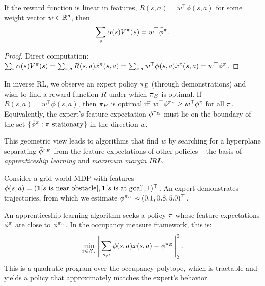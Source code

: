 \documentclass[11pt,a4paper]{article}
\begin{document}
\begin{proposition}
\label{prop:linear-reward}
If the reward function is linear in features,
$R(s,a) = w^\top \phi(s,a)$ for some weight vector $w \in \mathbb{R}^d$,
then
\[
    \sum_s \alpha(s) V^{\pi}(s) = w^\top \bar{\phi}^\pi.
\]
\end{proposition}

\begin{proof}
Direct computation:
$\sum_s \alpha(s) V^{\pi}(s) = \sum_{s,a} R(s,a)
\tilde{x}^\pi(s,a) = \sum_{s,a} w^\top \phi(s,a)
\tilde{x}^\pi(s,a) = w^\top \bar{\phi}^\pi$.
\end{proof}

\begin{remark}
\label{rem:irl-connection}
In inverse RL, we observe an expert policy $\pi_E$ (through
demonstrations) and wish to find a reward function $R$ under which
$\pi_E$ is optimal. If $R(s,a) = w^\top \phi(s,a)$, then
$\pi_E$ is optimal iff $w^\top \bar{\phi}^{\pi_E} \geq
w^\top \bar{\phi}^\pi$ for all $\pi$. Equivalently, the
expert's feature expectation $\bar{\phi}^{\pi_E}$ must lie on
the boundary of the set $\{\bar{\phi}^\pi : \pi \text{
stationary}\}$ in the direction $w$.

This geometric view leads to algorithms that find $w$ by searching
for a hyperplane separating $\bar{\phi}^{\pi_E}$ from the
feature expectations of other policies -- the basis of
\emph{apprenticeship learning} and \emph{maximum margin IRL}.
\end{remark}

\begin{example}
\label{ex:irl}
Consider a grid-world MDP with features
$\phi(s,a) = (\mathbf{1}[\text{$s$ is near obstacle}],
\mathbf{1}[\text{$s$ is at goal}], 1)^\top$. An expert
demonstrates trajectories, from which we estimate
$\bar{\phi}^{\pi_E} \approx (0.1, 0.8, 5.0)^\top$.

An apprenticeship learning algorithm seeks a policy $\pi$
whose feature expectations $\bar{\phi}^\pi$ are close to
$\bar{\phi}^{\pi_E}$. In the occupancy measure framework,
this is:
\[
    \min_{x \in \mathcal{X}_\alpha}
    \left\|\sum_{s,a} \phi(s,a) x(s,a) - \bar{\phi}^{\pi_E}
    \right\|_2^2.
\]
This is a quadratic program over the occupancy polytope, which is
tractable and yields a policy that approximately matches the
expert's behavior.
\end{example}
\end{document}
